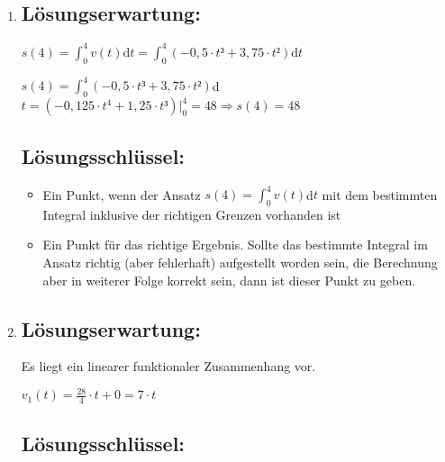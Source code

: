 \begin{langesbeispiel}
{\begin{enumerate}
	Auch die Berechnung über den Differenzenquotienten mit korrektem Grenzwertübergang ist zulässig. 	
	\subsection{Lösungsschlüssel:}
	\begin{itemize}
		\item  Ein Ausgleichspunkt, wenn $a(t)$ als 1. Ableitung der Geschwindigkeitsfunktion korrekt bestimmt wurde.
		\item  Ein Punkt für die korrekte Berechnung des Ergebnisses. Sollte $a(t)$ im Ansatz richtig (aber fehlerhaft) aufgestellt worden sein, die Berechnung aber in weiterer Folge korrekt sein, dann ist dieser Punkt zu geben.
	\end{itemize}
	
	\item \subsection{Lösungserwartung:}
		$s(4)=\int^4_0{v(t)}$d$t=\int^4_0{(-0,5\cdot t³+3,75\cdot t²)}$d$t$
		
		$s(4)=\int^4_0{(-0,5\cdot t³+3,75\cdot t²)}$d$t=(-0,125\cdot t^4+1,25\cdot t³)\big|^4_0=48\Rightarrow s(4)=48$
		
	\subsection{Lösungsschlüssel:}
	
\begin{itemize}
	\item Ein Punkt, wenn der Ansatz $s(4)=\int^4_0{v(t)}$d$t$ mit dem bestimmten Integral inklusive der richtigen Grenzen vorhanden ist
	\item  Ein Punkt für das richtige Ergebnis. Sollte das bestimmte Integral im Ansatz richtig (aber fehlerhaft) aufgestellt worden sein, die Berechnung aber in weiterer Folge korrekt sein, dann ist dieser Punkt zu geben.
\end{itemize}
	\item \subsection{Lösungserwartung:}
		Es liegt ein linearer funktionaler Zusammenhang vor.
		
		$v_1(t)=\frac{28}{4}\cdot t+0=7\cdot t$
		
	\subsection{Lösungsschlüssel:}
	

\end{enumerate}}
\end{langesbeispiel}
